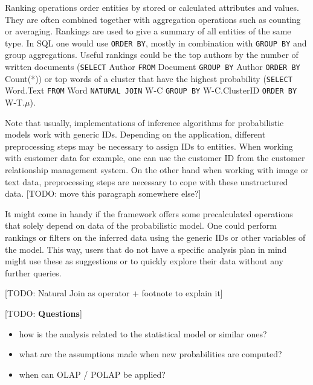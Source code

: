 Ranking operations order entities by stored or calculated attributes and values. They are often combined together with aggregation operations such as counting or averaging. Rankings are used to give a summary of all entities of the same type. In SQL one would use \texttt{ORDER BY}, mostly in combination with \texttt{GROUP BY} and group aggregations. Useful rankings could be the top authors by the number of written documents (\texttt{SELECT} Author \texttt{FROM} Document \texttt{GROUP BY} Author \texttt{ORDER BY} Count(*)) or top words of a cluster that have the highest probability (\texttt{SELECT} Word.Text \texttt{FROM} Word \texttt{NATURAL JOIN} W-C \texttt{GROUP BY} W-C.ClusterID \texttt{ORDER BY} W-T.$\mu$).

Note that usually, implementations of inference algorithms for probabilistic models work with generic IDs. Depending on the application, different preprocessing steps may be necessary to assign IDs to entities. When working with customer data for example, one can use the customer ID from the customer relationship management system. On the other hand when working with image or text data, preprocessing steps are necessary to cope with these unstructured data. [TODO: move this paragraph somewhere else?]

It might come in handy if the framework offers some precalculated operations that solely depend on data of the probabilistic model. One could perform rankings or filters on the inferred data using the generic IDs or other variables of the model. This way, users that do not have a specific analysis plan in mind might use these as suggestions or to quickly explore their data without any further queries.

[TODO: Natural Join as operator + footnote to explain it]

[TODO: \textbf{Questions}]
\begin{itemize}
\item how is the analysis related to the statistical model or similar ones?
\item what are the assumptions made when new probabilities are computed?
\item when can OLAP / POLAP be applied?
\end{itemize}
